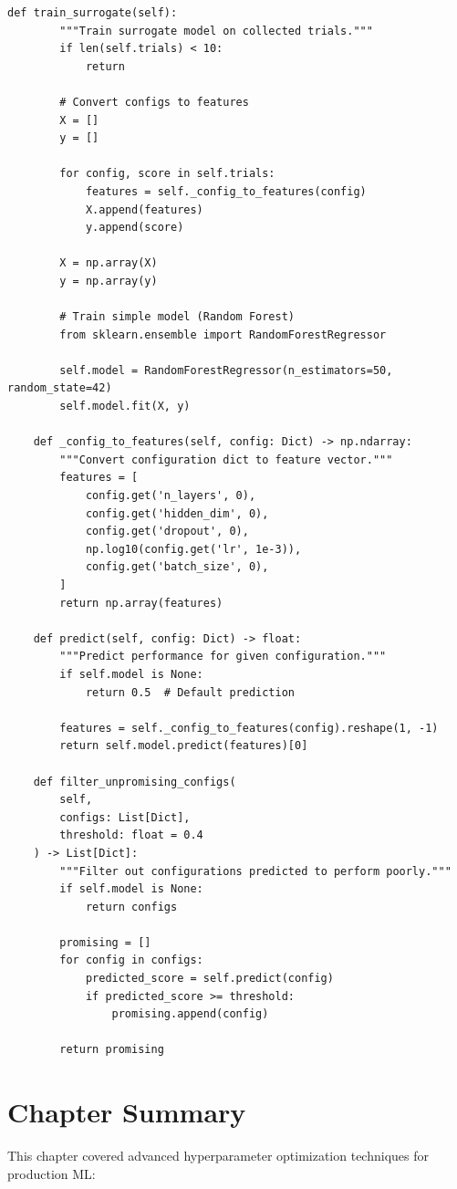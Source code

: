 \begin{lstlisting}[style=python, caption=Cost-efficient hyperparameter optimization]
    def train_surrogate(self):
        """Train surrogate model on collected trials."""
        if len(self.trials) < 10:
            return

        # Convert configs to features
        X = []
        y = []

        for config, score in self.trials:
            features = self._config_to_features(config)
            X.append(features)
            y.append(score)

        X = np.array(X)
        y = np.array(y)

        # Train simple model (Random Forest)
        from sklearn.ensemble import RandomForestRegressor

        self.model = RandomForestRegressor(n_estimators=50, random_state=42)
        self.model.fit(X, y)

    def _config_to_features(self, config: Dict) -> np.ndarray:
        """Convert configuration dict to feature vector."""
        features = [
            config.get('n_layers', 0),
            config.get('hidden_dim', 0),
            config.get('dropout', 0),
            np.log10(config.get('lr', 1e-3)),
            config.get('batch_size', 0),
        ]
        return np.array(features)

    def predict(self, config: Dict) -> float:
        """Predict performance for given configuration."""
        if self.model is None:
            return 0.5  # Default prediction

        features = self._config_to_features(config).reshape(1, -1)
        return self.model.predict(features)[0]

    def filter_unpromising_configs(
        self,
        configs: List[Dict],
        threshold: float = 0.4
    ) -> List[Dict]:
        """Filter out configurations predicted to perform poorly."""
        if self.model is None:
            return configs

        promising = []
        for config in configs:
            predicted_score = self.predict(config)
            if predicted_score >= threshold:
                promising.append(config)

        return promising
\end{lstlisting}

\section{Chapter Summary}

This chapter covered advanced hyperparameter optimization techniques for production ML:

